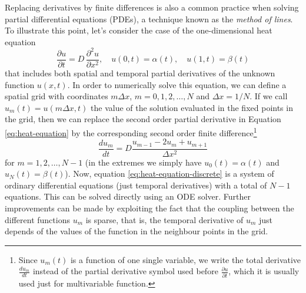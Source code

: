 Replacing derivatives by finite differences is also a common practice when solving partial differential equations (PDEs), a technique known as the \textit{method of lines}. 
To illustrate this point, let's consider the case of the one-dimensional heat equation
\begin{equation}
 \frac{\partial u}{\partial t}
 = 
 D \, 
 \frac{\partial^2 u}{\partial x^2}, 
 \quad u(0, t) = \alpha(t), 
 \quad u(1, t) = \beta(t)
 \label{eq:heat-equation}
\end{equation}
that includes both spatial and temporal partial derivatives of the unknown function $u(x, t)$.
In order to numerically solve this equation, we can define a spatial grid with coordinates $m \Delta x$, $m=0, 1, 2, \ldots, N$ and $\Delta x = 1 / N$.
If we call $u_m(t) = u(m \Delta x, t)$ the value of the solution evaluated in the fixed points in the grid, then we can replace the second order partial derivative in Equation \eqref{eq:heat-equation} by the corresponding second order finite difference\footnote{Since $u_m(t)$ is a function of one single variable, we write the total derivative $\frac{du_m}{dt}$ instead of the partial derivative symbol used before $\frac{\partial u}{\partial t}$, which it is usually used just for multivariable function.}
\begin{equation}
 \frac{d u_m}{dt} 
 = 
 D 
 \frac{u_{m-1} - 2u_m + u_{m+1}}{\Delta x^2}
 \label{eq:heat-equation-discrete}
\end{equation}
for $m = 1, 2, \ldots, N-1$ (in the extremes we simply have $u_0(t) = \alpha(t)$ and $u_N(t)=\beta(t)$).
Now, equation \eqref{eq:heat-equation-discrete} is a system of ordinary differential equations (just temporal derivatives) with a total of $N-1$ equations.
This can be solved directly using an ODE solver.
Further improvements can be made by exploiting the fact that the coupling between the different functions $u_m$ is sparse, that is, the temporal derivative of $u_m$ just depends of the values of the function in the neighbour points in the grid.

